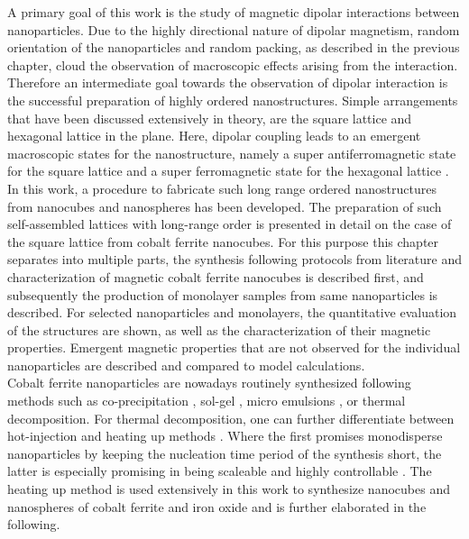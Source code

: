 \documentclass[\main/dresen_thesis.tex]{subfiles}
\begin{document}
  A primary goal of this work is the study of magnetic dipolar interactions between nanoparticles.
  Due to the highly directional nature of dipolar magnetism, random orientation of the nanoparticles and random packing, as described in the previous chapter, cloud the observation of macroscopic effects arising from the interaction.
  Therefore an intermediate goal towards the observation of dipolar interaction is the successful preparation of highly ordered nanostructures.
  Simple arrangements that have been discussed extensively in theory, are the square lattice and hexagonal lattice in the plane.
  Here, dipolar coupling leads to an emergent macroscopic states for the nanostructure, namely a super antiferromagnetic state for the square lattice and a super ferromagnetic state for the hexagonal lattice \cite{Politi_2002_Dipol, Russier_2001_Calcu, Varon_2013_Dipol}.
  In this work, a procedure to fabricate such long range ordered nanostructures from nanocubes and nanospheres has been developed.
  The preparation of such self-assembled lattices with long-range order is presented in detail on the case of the square lattice from cobalt ferrite nanocubes.
  For this purpose this chapter separates into multiple parts, the synthesis following protocols from literature and characterization of magnetic cobalt ferrite nanocubes is described first, and subsequently the production of monolayer samples from same nanoparticles is described.
  For selected nanoparticles and monolayers, the quantitative evaluation of the structures are shown, as well as the characterization of their magnetic properties. Emergent magnetic properties that are not observed for the individual nanoparticles are described and compared to model calculations.
  \\

  Cobalt ferrite nanoparticles are nowadays routinely synthesized following methods such as co-precipitation \cite{Fried_2001_Order}, sol-gel \cite{Niederberger_2009_Metal}, micro emulsions \cite{Pillai_1996_Synth}, or thermal decomposition.
  For thermal decomposition, one can further differentiate between hot-injection \cite{Hyeon_2003_Chemi} and heating up methods \cite{Embden_2015_TheHe}.
  Where the first promises monodisperse nanoparticles by keeping the nucleation time period of the synthesis short, the latter is especially promising in being scaleable and highly controllable \cite{Park_2004_Ultra}.
  The heating up method is used extensively in this work to synthesize nanocubes and nanospheres of cobalt ferrite and iron oxide and is further elaborated in the following.
\end{document}
